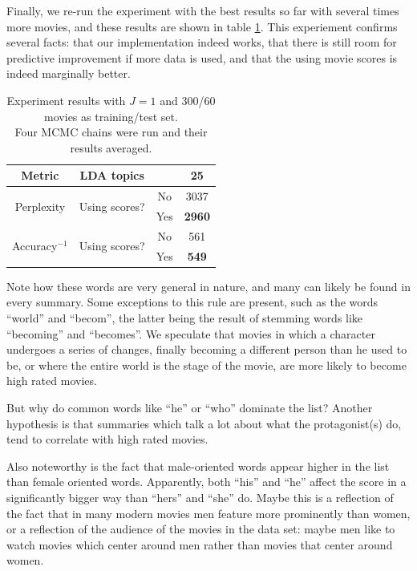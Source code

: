 \documentclass{article} %
\begin{document}
Finally, we re-run the experiment with the best results so far with several times more movies, and these results are shown in table \ref{tab:best}. This experiement confirms several facts: that our implementation indeed works, that there is still room for predictive improvement if more data is used, and that the using movie scores is indeed marginally better.

\begin{table}[ht!]
\captionsetup{justification=centering}
\caption{Experiment results with $J=1$ and 300/60 movies as training/test set.\\Four MCMC chains were run and their results averaged.} 
\label{tab:best}
\begin{center}
\begin{tabular}{c|cc|c}

Metric &	LDA topics      & & 25 \\ \hline
\multirow{2}{*}{Perplexity} &	\multirow{2}{*}{Using scores?} & No  & 3037 \\
			  &             & Yes & \textbf{2960} \\ \hline
\multirow{2}{*}{Accuracy$^{-1}$} & \multirow{2}{*}{Using scores?} & No  & 561 \\
			      &          & Yes & \textbf{549} \\
\end{tabular}
\end{center}
\end{table}

Note how these words are very general in nature, and many can likely be found in every summary. 
Some exceptions to this rule are present, such as the words ``world'' and ``becom'', the latter being the result of stemming words like ``becoming'' and ``becomes''.
We speculate that movies in which a character undergoes a series of changes, finally becoming a different person than he used to be, or where the entire world is the stage of the movie, are more likely to become high rated movies.

But why do common words like ``he'' or ``who'' dominate the list? 
Another hypothesis is that summaries which talk a lot about what the protagonist(s) do, tend to correlate with high rated movies.

Also noteworthy is the fact that male-oriented words appear higher in the list than female oriented words.
Apparently, both ``his'' and ``he'' affect the score in a significantly bigger way than ``hers'' and ``she'' do. 
Maybe this is a reflection of the fact that in many modern movies men feature more prominently than women, or a reflection of the audience of the movies in the data set: maybe men like to watch movies which center around men rather than movies that center around women.
\end{document}
